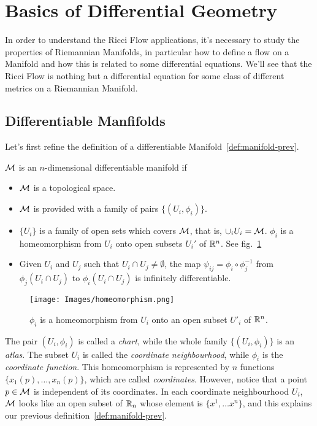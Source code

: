 \section{Basics of Differential Geometry}
In order to understand the Ricci Flow applications, it's necessary to study the properties of Riemannian Manifolds, in particular how to define a flow on a Manifold and how this is related to some differential equations. We'll see that the Ricci Flow is nothing but a differential equation for some class of different metrics on a Riemannian Manifold.


\subsection{Differentiable Manfifolds}
Let's first refine the definition of a differentiable Manifold~\ref{def:manifold-prev}.

\begin{definition}
    $\mathcal{M}$ is an $n$-dimensional differentiable manifold if
    \begin{itemize}
        \item $\mathcal{M}$ is a topological space.
        \item $\mathcal{M}$ is provided with a family of pairs $\{ (U_i, \phi_i) \}$.
        \item $\{U_i\}$ is a family of open sets which covers $\mathcal{M}$, that is, $\cup_i U_i = \mathcal{M}$. $\phi_i$ is a homeomorphism from $U_i$ onto open subsets $U_i'$ of $\mathbb{R}^n$. See fig.~\ref{fig:homeomorphism}
        \item Given $U_i$ and $U_j$ such that $U_i \cap U_j \neq \emptyset$, the map $\psi_{ij} = \phi_i \circ \phi_j^{-1}$ from $\phi_j (U_i \cap U_j)$ to $\phi_i(U_i \cap U_j)$ is infinitely differentiable.
    \end{itemize}
\end{definition}

\begin{figure}
    \centering
    \texttt{[image: Images/homeomorphism.png]}
    \caption{$\phi_i$ is a homeomorphism from $U_i$ onto an open subset $U'_i$ of $\mathbb{R}^n$.}
    \label{fig:homeomorphism}
\end{figure}

The pair $(U_i, \phi_i)$ is called a \emph{chart}, while the whole family $\{(U_i, \phi_i)\}$ is an \emph{atlas}. The subset $U_i$ is called the \emph{coordinate neighbourhood}, while $\phi_i$ is the \emph{coordinate function}. This homeomorphism is represented by $n$ functions $\{x_1(p), \dots, x_n(p)\}$, which are called \emph{coordinates}. However, notice that a point $p\in\mathcal{M}$ is independent of its coordinates. In each coordinate neighbourhood $U_i$, $\mathcal{M}$ looks like an open subset of $\mathbb{R}_n$ whose element is $\{x^1, \dots x^n\}$, and this explains our previous definition~\ref{def:manifold-prev}.

